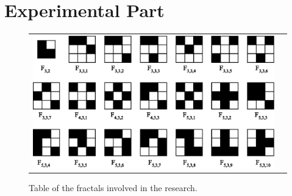 \section {Experimental Part }

\begin{figure}
\centering
\begin{tabular}{cc}
\includegraphics{involvedFractals/fractals.eps}
\end{tabular}
\caption{Table of the fractals involved in the research.}
\label{fig:involvedFractals}
\end{figure}

